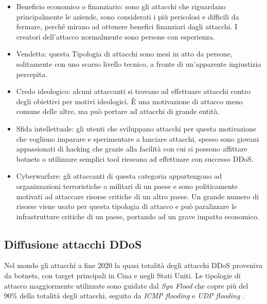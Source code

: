 \begin{itemize}
    \item Beneficio economico o finanziario: sono gli attacchi che riguardano principalmente le aziende, sono considerati i più pericolosi e difficili da fermare, perché mirano ad ottenere benefici finanziari dagli attacchi. I creatori dell'attacco normalmente sono persone con esperienza.
    \item Vendetta: questa Tipologia di attacchi sono mesi in atto da persone, solitamente con uno scarso livello tecnico, a fronte di un'apparente ingiustizia percepita.
    \item Credo ideologico: alcuni attaccanti si trovano ad effettuare attacchi contro degli obiettivi per motivi ideologici. È una motivazione di attacco meno comune delle altre, ma può portare ad attacchi di grande entità. %
    \item Sfida intellettuale: gli utenti che sviluppano attacchi per questa motivazione che vogliono imparare e sperimentare a lanciare attacchi, spesso sono giovani appassionati di hacking che grazie alla facilità con cui si possono affittare botnets o utilizzare semplici tool riescono ad effettuare con successo DDoS.
    \item Cyberwarfare: gli attaccanti di questa categoria appartengono ad organizzazioni terroristiche o militari di un paese e sono politicamente motivati ad attaccare risorse critiche di un altro paese. Un grande numero di risorse viene usato per questa tipologia di attacco e può paralizzare le infrastrutture critiche di un paese, portando ad un grave impatto economico.
\end{itemize}


\subsection{Diffusione attacchi DDoS}

Nel mondo gli attacchi a fine 2020 la quasi totalità degli attacchi DDoS proveniva da botnets, con target principali in Cina e negli Stati Uniti. Le tipologie di attacco maggiormente utilizzate sono guidate dal \emph{Syn Flood} che copre più del 90\% della totalità degli attacchi, seguito da \emph{ICMP flooding} e \emph{UDP flooding} \cite{ddos_kaspersky} \cite{ddos_kaspersky_q3_2020}.

